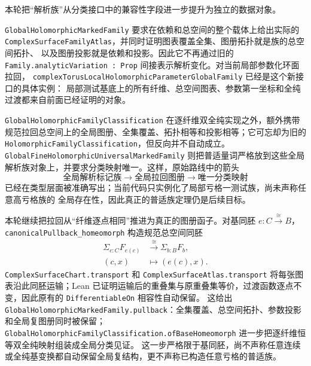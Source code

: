 \documentclass[UTF8,fontset=none,a4paper,11pt]{ctexart}
\begin{document}
本轮把“解析族”从分类接口中的兼容性字段进一步提升为独立的数据对象。
\par
\texttt{Global\allowbreak Holomorphic\allowbreak Marked\allowbreak Family} 要求在依赖和总空间的整个载体上给出实际的
\texttt{ComplexSurfaceFamily\allowbreak Atlas}，并同时证明图表覆盖全集、图册拓扑就是族的总空间拓扑、
以及图册投影就是依赖和投影。因此它不再通过旧的
\texttt{Family.analyticVariation : Prop} 间接表示解析变化。对当前局部参数化环面拉回，
\texttt{complexTorusLocalHolomorphicParameter\allowbreak Global\allowbreak Family} 已经是这个新接口的具体实例：
局部测试基底上的所有纤维、总空间图表、参数第一坐标和全纯过渡都来自前面已经证明的对象。

\texttt{GlobalHolomorphic\allowbreak Family\allowbreak Classification} 在逐纤维双全纯实现之外，额外携带
规范拉回总空间上的全局图册、全集覆盖、拓扑相等和投影相等；它可忘却为旧的
\texttt{HolomorphicFamily\allowbreak Classification}，但反向并不自动成立。\texttt{GlobalFineHolomorphicUniversal\allowbreak Marked\allowbreak Family}
则把普适量词严格放到这些全局解析族对象上，并要求分类映射唯一。这样，原始路线中的箭头
\[
  \text{全局解析标记族}\longrightarrow\text{全局拉回图册}\longrightarrow\text{唯一分类映射}
\]
已经在类型层面被准确写出；当前代码只实例化了局部亏格一测试族，尚未声称任意高亏格族的
全局存在性，因此真正的普适族定理仍是后续目标。

本轮继续把拉回从“纤维逐点相同”推进为真正的图册函子。对基同胚
\(e:C\mathbin{\xrightarrow{\cong}}B\)，
\texttt{canonicalPullback\_homeomorph} 构造规范总空间同胚
\[
  \begin{aligned}
  \Sigma_{c:C}F_{e(c)}&\xrightarrow{\cong}\Sigma_{b:B}F_b,\\
  (c,x)&\longmapsto(e(c),x).
  \end{aligned}
\]
\texttt{ComplexSurfaceChart.transport} 和
\texttt{ComplexSurfaceAtlas.transport} 将每张图表沿此同胚运输；Lean 已证明运输后的重叠集与原重叠集等价，过渡函数逐点不变，因此原有的
\texttt{DifferentiableOn} 相容性自动保留。
这给出 \texttt{GlobalHolomorphic\allowbreak Marked\allowbreak Family\allowbreak.pullback}：全集覆盖、总空间拓扑、参数投影和全局复图册同时被保留；
\texttt{GlobalHolomorphic\allowbreak Family\allowbreak Classification\allowbreak.ofBaseHomeomorph} 进一步把逐纤维恒等双全纯映射组装成全局分类见证。
这一步严格限于基同胚，尚不声称任意连续或全纯基变换都自动保留全局复结构，更不声称已构造任意亏格的普适族。
\end{document}
